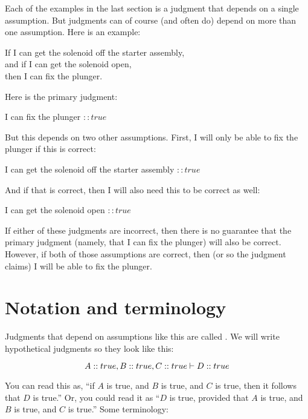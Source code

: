 \documentclass[../../../main.tex]{subfiles}
\begin{document}
Each of the examples in the last section is a judgment that depends on a single assumption. But judgments can of course (and often do) depend on more than one assumption. Here is an example:

\begin{center}
  If I can get the solenoid off the starter assembly, \\
  and if I can get the solenoid open, \\
  then I can fix the plunger.
\end{center}

\noindent
Here is the primary judgment:

\begin{center}
  I can fix the plunger $:: true$
\end{center}

\noindent
But this depends on two other assumptions. First, I will only be able to fix the plunger if this is correct:

\begin{center}
  I can get the solenoid off the starter assembly $:: true$
\end{center}

\noindent
And if that is correct, then I will also need this to be correct as well:

\begin{center}
  I can get the solenoid open $:: true$
\end{center}

\noindent
If either of these judgments are incorrect, then there is no guarantee that the primary judgment (namely, that I can fix the plunger) will also be correct. However, if both of those assumptions are correct, then (or so the judgment claims) I will be able to fix the plunger. 


\section{Notation and terminology}

Judgments that depend on assumptions like this are called . We will write hypothetical judgments so they look like this:

\begin{equation*}
  A :: true, B :: true, C :: true \ndturnstile/ D :: true
\end{equation*}

\noindent
You can read this as, ``if $A$ is true, and $B$ is true, and $C$ is true, then it follows that $D$ is true.'' Or, you could read it as ``$D$ is true, provided that $A$ is true, and $B$ is true, and $C$ is true.'' Some terminology:
\end{document}
